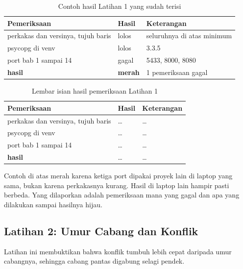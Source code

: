 \begin{table}[!htb]
  \centering
  \caption{Contoh hasil Latihan 1 yang sudah terisi}
  \label{tab:c01-lat1-contoh}
  \begin{tabularx}{\textwidth}{Xll}
    \hline
    \textbf{Pemeriksaan} & \textbf{Hasil} & \textbf{Keterangan} \\
    \hline
    perkakas dan versinya, tujuh baris & lolos & seluruhnya di atas minimum \\
    \hline
    psycopg di venv & lolos & 3.3.5 \\
    \hline
    port bab 1 sampai 14 & gagal & 5433, 8000, 8080 \\
    \hline
    \textbf{hasil} & \textbf{merah} & 1 pemeriksaan gagal \\
    \hline
  \end{tabularx}
\end{table}

\begin{table}[!htb]
  \centering
  \caption{Lembar isian hasil pemeriksaan Latihan 1}
  \label{tab:c01-lat1-hasil}
  \begin{tabularx}{\textwidth}{Xll}
    \hline
    \textbf{Pemeriksaan} & \textbf{Hasil} & \textbf{Keterangan} \\
    \hline
    perkakas dan versinya, tujuh baris & \dots & \dots \\
    \hline
    psycopg di venv & \dots & \dots \\
    \hline
    port bab 1 sampai 14 & \dots & \dots \\
    \hline
    \textbf{hasil} & \dots & \dots \\
    \hline
  \end{tabularx}
\end{table}

Contoh di atas merah karena ketiga port dipakai proyek lain di laptop yang
sama, bukan karena perkakasnya kurang. Hasil di laptop lain hampir pasti
berbeda. Yang dilaporkan adalah pemeriksaan mana yang gagal dan apa yang
dilakukan sampai hasilnya hijau.

\subsection*{Latihan 2: Umur Cabang dan Konflik}

Latihan ini membuktikan bahwa konflik tumbuh lebih cepat daripada umur
cabangnya, sehingga cabang pantas digabung selagi pendek.

